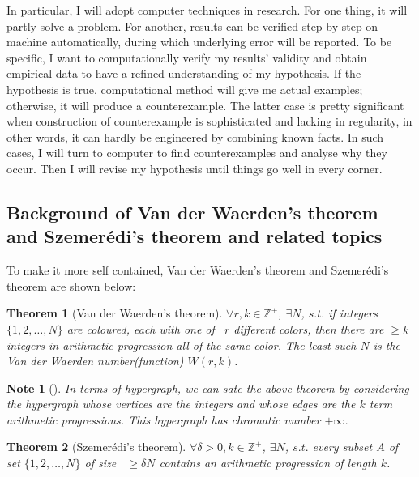 \documentclass[12pt]{article}
\newtheorem{note}{Note}
\newtheorem{theorem}{Theorem}
\begin{document}
In particular, I will adopt computer techniques in research. For one thing, it will partly solve a problem. For another, results can be verified step by step on machine automatically, during which underlying error will be reported. To be specific, I want to computationally verify my results' validity and obtain empirical data to have a refined understanding of my hypothesis. If the hypothesis is true, computational method will give me actual examples; otherwise, it will produce a counterexample. The latter case is pretty significant when construction of counterexample is sophisticated and lacking in regularity, in other words, it can hardly be engineered by combining known facts. In such cases, I will turn to computer to find counterexamples and analyse why they occur. Then I will revise my hypothesis until things go well in every corner.

\bigskip

\subsection{Background of Van der Waerden's theorem and Szemer\'{e}di's theorem and related topics}\label{backgnd}

To make it more self contained, Van der Waerden's theorem and Szemer\'{e}di's theorem are shown below:

\begin{theorem}[Van der Waerden's theorem\cite{van}]
$\forall r, k \in \mathbb{Z}^{+}$, $\exists N$, $s.t.$ if integers $\{1, 2, \hdots, N\}$ are coloured, each with one of ~$r$ different colors, then there are $\geq k$ integers in arithmetic progression all of the same color. The least such $N$ is the Van der Waerden number(function) $W(r, k)$.
\end{theorem}

\begin{note}[\cite{erdos}]
In terms of hypergraph, we can sate the above theorem by considering the hypergraph whose vertices are the integers and whose edges are the $k$ term arithmetic progressions. This hypergraph has chromatic number $+\infty$.
\end{note}

\begin{theorem}[Szemer\'{e}di's theorem\cite{sz}]
$\forall \delta > 0, k \in \mathbb{Z}^{+}$, $\exists N$, $s.t.$ every subset $A$ of set $\{1, 2, \hdots, N\}$ of size ~$\geq \delta N$ contains an arithmetic progression of length $k$.
\end{theorem}
\end{document}
